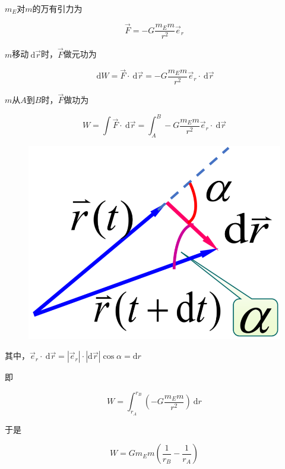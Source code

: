 \documentclass[12pt, a4paper]{article}
\numberwithin{equation}{section}
\newcommand{\rmd}{\mathrm{~d}}
\begin{document}
    \(m_{E}\)对\(m\)的万有引力为

    $$
        \overrightarrow{F}=-G \frac{m_{E} m}{r^2} \overrightarrow{e}_r
    $$

    \(m\)移动\(\rmd \overrightarrow{r}\)时，\(\overrightarrow{F}\)做元功为

    $$
        \rmd W = \overrightarrow{F} \cdot \rmd \overrightarrow{r}
        =-G \frac{m_{E} m}{r^2} \overrightarrow{e}_r \cdot \rmd \overrightarrow{r}
    $$

    \(m\)从\(A\)到\(B\)时，\(\overrightarrow{F}\)做功为

    $$
    W=\int \overrightarrow{F} \cdot \rmd \overrightarrow{r}
    =\int_A^B-G \frac{m_{E} m}{r^2} \overrightarrow{e}_r \cdot \rmd \overrightarrow{r}
    $$

    \begin{figure}
        \centering
        \includegraphics[scale=0.15]{"Chapter 03 images/pic6.png"}
        \label{pic6}
    \end{figure}

    其中，$\overrightarrow{e}_r \cdot \mathrm{~d} \overrightarrow{r}=
    \left|\overrightarrow{e}_r\right| \cdot|\mathrm{d} \overrightarrow{r}| \cos \alpha=\mathrm{d} r$

    即

    $$
        W=\int_{r_A}^{r_B} \left(-G \frac{m_E m}{r^2}\right) \rmd r
    $$

    于是

    \begin{equation}
        W=G m_{E} m\left(\frac{1}{r_B}-\frac{1}{r_A}\right)
    \end{equation}
\end{document}
